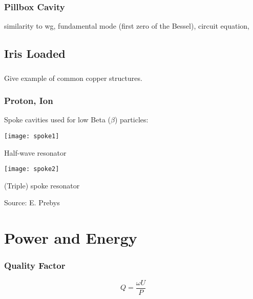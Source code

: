 \documentclass[professionalfonts,t]{beamer}
\begin{document}
\begin{frame}
	\frametitle{Pillbox Cavity}
	similarity to wg, fundamental mode (first zero of the Bessel), 
	circuit equation, 
\end{frame}


\subsection{Iris Loaded}
\begin{frame}
	\frametitle{}
	Give example of common copper structures. 
\end{frame}

\begin{frame}
\frametitle{Proton, Ion}
Spoke cavities used for low Beta ($\beta$) particles:
\vspace{0.25em}

\centering
\begin{minipage}{0.45\textwidth}
	\centering
	\texttt{[image: spoke1]}
	
	Half-wave resonator
\end{minipage}\hspace{-1em}
\begin{minipage}{0.5\textwidth}
	\centering
	\texttt{[image: spoke2]}
	
	(Triple) spoke resonator
\end{minipage}

\vspace{1em}
\hfill Source: E. Prebys
\end{frame}



\section{Power and Energy }
\begin{frame}
	\frametitle{Quality Factor}
	\begin{equation}
		Q= \frac{\omega U}{P}
	\end{equation}
\end{frame}
\end{document}
